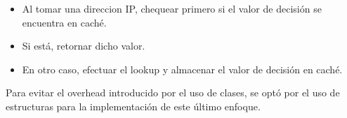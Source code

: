 \begin{itemize}
	\item Al tomar una direccion IP, chequear primero si el valor de decisión se encuentra en caché.
	\item Si está, retornar dicho valor.
	\item En otro caso, efectuar el lookup y almacenar el valor de decisión en caché.
\end{itemize}

Para evitar el overhead introducido por el uso de clases, se optó por el uso de estructuras para la implementación de este último enfoque.

\begin{comment}
\section{Parte HW}

\subsection{Componentes del sistema}

\subsubsection*{NIOS II}

Es un microprocesador softcore. Esto significa que el mismo es instanciado usando la lógica propia de la FPGA. En este diseño, ejecuta un software de clasificación de paquetes que se almacena en una memoria SDRAM en la placa de desarrollo.

\subsubsection*{PLL}

Este módulo toma como entrada una señal de clocl de 50 MHZ de frecuencia y la bifurca en 2: Una de ellas alimentará al módulo que oficia de interfaz con la memoria SDRAM y la otra hará lo propio con el resto de los componentes del sistema. Estas señales están defasadas entre sí 60º con el fin de evitar el skew producido por la diferencia entre la llegada del clock a la memoria y al resto del sistema.

\subsubsection*{Timer}

Módulo utilizado para llevar estadísticas de retardo dentro del software.


\end{comment}
